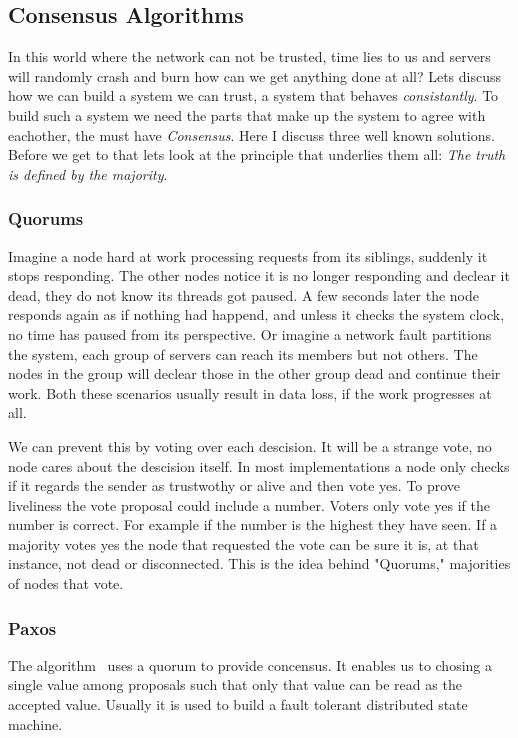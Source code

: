 \subsection{Consensus Algorithms}
In this world where the network can not be trusted, time lies to us and servers will randomly crash and burn how can we get anything done at all? Lets discuss how we can build a system we can trust, a system that behaves \textit{consistantly}. To build such a system we need the parts that make up the system to agree with eachother, the must have \emph{Consensus}. Here I discuss three well known solutions. Before we get to that lets look at the principle that underlies them all: \emph{The truth is defined by the majority}.

\subsubsection*{Quorums}
Imagine a node hard at work processing requests from its siblings, suddenly it stops responding. The other nodes notice it is no longer responding and declear it dead, they do not know its threads got paused. A few seconds later the node responds again as if nothing had happend, and unless it checks the system clock, no time has paused from its perspective. Or imagine a network fault partitions the system, each group of servers can reach its members but not others. The nodes in the group will declear those in the other group dead and continue their work. Both these scenarios usually result in data loss, if the work progresses at all.

We can prevent this by voting over each descision. It will be a strange vote, no node cares about the descision itself. In most implementations a node only checks if it regards the sender as trustwothy or alive and then vote yes. To prove liveliness the vote proposal could include a number. Voters only vote yes if the number is correct. For example if the number is the highest they have seen. If a majority votes yes the node that requested the vote can be sure it is, at that instance, not dead or disconnected. This is the idea behind "Quorums," majorities of nodes that vote.

\subsubsection*{Paxos}
The \paxos{} algorithm~\cite{paxos} uses a quorum to provide concensus. It enables us to chosing a single value among proposals such that only that value can be read as the accepted value. Usually it is used to build a fault tolerant distributed state machine. 

